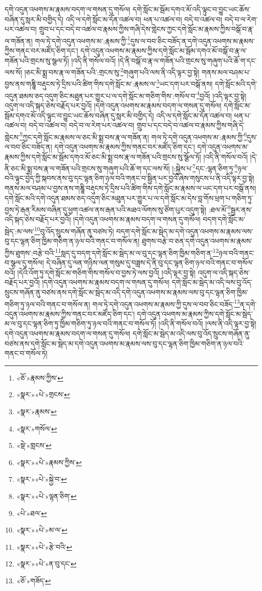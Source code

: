 དགེ་འདུན་འཕགས་མ་རྣམས་བདག་ལ་གསན་དུ་གསོལ། དགེ་སློང་མ་སྦོམ་དགའ་མོ་འདི་ལྟུང་བ་བྱུང་ཡང་ཆོས་བཞིན་དུ་སླར་མི་བགྱིད་དེ། འདི་ལ་དགེ་སློང་མ་དོན་འཚལ་བ། ཕན་པ་འཚལ་བ། བདེ་བ་འཚལ་བ། བདེ་བ་ལ་རེག་པར་འཚལ་བ། གྲུབ་པ་དང་བདེ་བ་འཚལ་བ་རྣམས་ཀྱིས་གཞི་དེས་གླེངས་ཀྱང་དགེ་སློང་མ་རྣམས་ཀྱིས་བསྒོ་བ་རྣ་ལ་གཟོན་ན། གལ་ཏེ་དགེ་འདུན་འཕགས་མ་:རྣམས་ཀྱི་\footnote{«ཅོ་»རྣམས་ཀྱིས་}དུས་ལ་བབ་ཅིང་བཟོད་ན་དགེ་འདུན་འཕགས་མ་རྣམས་ཀྱིས་གནང་བར་མཛོད་ཅིག་དང་། དགེ་འདུན་འཕགས་མ་རྣམས་ཀྱིས་དགེ་སློང་མ་སྦོམ་དགའ་མོ་བསྒོ་བ་རྣ་ལ་གཟོན་པའི་གྲངས་སུ་སྩལ་ཏོ། །འདི་ནི་གསོལ་བའོ། །དེ་ནི་བསྒོ་བ་རྣ་ལ་གཟོན་པའི་གྲངས་སུ་གཞུག་པའི་ཆོ་ག་དང་ལས་སོ། །ཅང་མི་སྨྲ་བས་རྣ་ལ་གཟོན་པའི་:གྲངས་སུ་\footnote{«སྣར་»«པེ་»གྲངས་}གཞུག་པའི་ལས་ནི་འདི་ལྟར་བྱ་སྟེ། གནས་མལ་བཤམ་པ་བྱས་ནས་གཎྜཱི་བརྡུངས་ཏེ་དྲིས་པའི་ཚིག་གིས་དགེ་སློང་མ་:རྣམས་ལ་\footnote{«སྣར་»རྣམས་}ཡང་དག་པར་བསྒོ་ནས། དགེ་སློང་མའི་དགེ་འདུན་ཐམས་ཅད་འདུག་ཅིང་མཐུན་པར་གྱུར་པ་ལ་དགེ་སློང་མ་གཅིག་གིས་:གསོལ་བ་\footnote{«སྣར་»གསོལ་}བྱའོ། །འདི་ལྟར་བྱ་སྟེ། འདུག་ལ་འདི་སྐད་ཅེས་བརྗོད་པར་བྱའོ། །དགེ་འདུན་འཕགས་མ་རྣམས་བདག་ལ་གསན་དུ་གསོལ། དགེ་སློང་མ་སྦོམ་དགའ་མོ་འདི་ལྟུང་བ་བྱུང་ཡང་ཆོས་བཞིན་དུ་སླར་མི་བགྱིད་དེ། འདི་ལ་དགེ་སློང་མ་དོན་འཚལ་བ། ཕན་པ་འཚལ་བ། བདེ་བ་འཚལ་བ། བདེ་བ་ལ་རེག་པར་འཚལ་བ། གྲུབ་པ་དང་བདེ་བ་འཚལ་བ་རྣམས་ཀྱིས་གཞི་དེ་གླེངས་\footnote{«སྡེ་»གླངས་}ཀྱང་དགེ་སློང་མ་རྣམས་ལ་ཅང་མི་སྨྲ་བས་རྣ་ལ་གཟོན་ན། གལ་ཏེ་དགེ་འདུན་འཕགས་མ་:རྣམས་ཀྱི་\footnote{«སྣར་»«པེ་»རྣམས་ཀྱིས་}དུས་ལ་བབ་ཅིང་བཟོད་ན། དགེ་འདུན་འཕགས་མ་རྣམས་ཀྱིས་གནང་བར་མཛོད་ཅིག་དང་། དགེ་འདུན་འཕགས་མ་རྣམས་ཀྱིས་དགེ་སློང་མ་སྦོམ་དགའ་མོ་ཅང་མི་སྨྲ་བས་རྣ་ལ་གཟོན་པའི་གྲངས་སུ་སྩོལ་ཏོ། །འདི་ནི་གསོལ་བའོ། །དེ་ནི་ཅང་མི་སྨྲ་བས་རྣ་ལ་གཟོན་པའི་གྲངས་སུ་གཞུག་པའི་ཆོ་ག་དང་ལས་སོ། །:སྐྱེས་པ་\footnote{«སྣར་»«པེ་»སྐྱེ་བ་}དང་:ལྷན་ཅིག་ཏུ་\footnote{«སྣར་»«པེ་»ལྷན་ཅིག་}ཉལ་བའི་ལྟུང་བྱེད་ཀྱི་སྐབས་ནས་བུ་དང་ལྷན་ཅིག་ཉལ་བའི་གནང་བ་སྦྱིན་པར་བྱའོ་ཞེས་གསུངས་པ་ནི་འདི་ལྟར་བྱ་སྟེ། གནས་མལ་བཤམ་པ་བྱས་ནས་གཎྜཱི་བརྡུངས་ཏེ་དྲིས་པའི་ཚིག་གིས་དགེ་སློང་མ་རྣམས་ལ་ཡང་དག་པར་བསྒོ་ནས། དགེ་སློང་མའི་དགེ་འདུན་ཐམས་ཅད་འདུག་ཅིང་མཐུན་པར་གྱུར་པ་ལ་དགེ་སློང་མ་དེས་བླ་གོས་ཕྲག་པ་གཅིག་ཏུ་བྱས་ཏེ་རྒན་རིམས་བཞིན་དུ་ཕྱག་འཚལ་ནས་རྒན་པའི་མཐའ་ལོགས་སུ་ཙོག་པུར་འདུག་སྟེ། :ཐལ་མོ་\footnote{«པེ་»ཐལ་}སྦྱར་ནས་འདི་སྐད་ཅེས་བརྗོད་པར་བྱའོ། །དགེ་འདུན་འཕགས་མ་རྣམས་བདག་ལ་གསན་དུ་གསོལ། བདག་དགེ་སློང་མ་སྦེད་:མ་ལས་\footnote{«སྣར་»«པེ་»མ་ལ་}བུ་འོད་སྲུངས་གཞོན་ནུ་བཙས་ཏེ། བདག་དགེ་སློང་མ་སྦེད་མ་དགེ་འདུན་འཕགས་མ་རྣམས་ལས་བུ་དང་ལྷན་ཅིག་ཁྱིམ་གཅིག་ན་ཉལ་བའི་གནང་བ་གསོལ་ན། ཐུགས་བརྩེ་བ་ཅན་དགེ་འདུན་འཕགས་མ་རྣམས་ཀྱིས་ཐུགས་:བརྩེ་བའི་\footnote{«སྣར་»«པེ་»རྩེ་བའི་}སླད་དུ་བདག་དགེ་སློང་མ་སྦེད་མ་ལ་བུ་དང་ལྷན་ཅིག་ཁྱིམ་གཅིག་ན་\footnote{«སྣར་»«པེ་»ན་བུ་དང་}ཉལ་བའི་གནང་བ་སྩལ་དུ་གསོལ། དེ་བཞིན་དུ་ལན་གཉིས་ལན་གསུམ་དུ་བཟླས་དེ་ནི་བུ་དང་ལྷན་ཅིག་ཉལ་བའི་གནང་བ་གསོལ་བའོ། །དེའི་འོག་ཏུ་དགེ་སློང་མ་གཅིག་གིས་གསོལ་བ་བྱས་ཏེ་ལས་བྱའོ། །འདི་ལྟར་བྱ་སྟེ། འདུག་ལ་འདི་སྐད་ཅེས་བརྗོད་པར་བྱའོ། །དགེ་འདུན་འཕགས་མ་རྣམས་བདག་ལ་གསན་དུ་གསོལ། དགེ་སློང་མ་སྦེད་མ་འདི་ལས་བུ་འོད་སྲུངས་གཞོན་ནུ་བཙས་ནས་དགེ་སློང་མ་སྦེད་མ་འདི་དགེ་འདུན་འཕགས་མ་རྣམས་ལས་བུ་དང་ལྷན་ཅིག་ཁྱིམ་གཅིག་ཏུ་ཉལ་བའི་གནང་བ་གསོལ་ན། གལ་ཏེ་དགེ་འདུན་འཕགས་མ་རྣམས་ཀྱི་དུས་ལ་བབ་ཅིང་བཟོད་\footnote{«ཅོ་»གཟོད་}ན་དགེ་འདུན་འཕགས་མ་རྣམས་ཀྱིས་གནང་བར་མཛོད་ཅིག་དང་། དགེ་འདུན་འཕགས་མ་རྣམས་ཀྱིས་དགེ་སློང་མ་སྦེད་མ་ལ་བུ་དང་ལྷན་ཅིག་ཏུ་ཁྱིམ་གཅིག་ཏུ་ཉལ་བའི་གནང་བ་གསོལ་ཏོ། །འདི་ནི་གསོལ་བའོ། །ལས་ནི་འདི་ལྟར་བྱ་སྟེ། དགེ་འདུན་འཕགས་མ་རྣམས་བདག་ལ་གསན་དུ་གསོལ། དགེ་སློང་མ་སྦེད་མ་འདི་ལས་བུ་འོད་སྲུངས་གཞོན་ནུ་བཙས་ནས་དགེ་སློང་མ་སྦེད་མ་དགེ་འདུན་འཕགས་མ་རྣམས་ལས་བུ་དང་ལྷན་ཅིག་ཁྱིམ་གཅིག་ན་ཉལ་བའི་གནང་བ་གསོལ་ཏེ། 